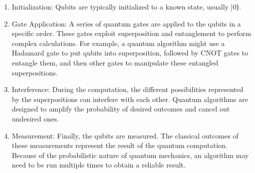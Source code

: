 \documentclass{article}
\begin{document}
 \begin{enumerate}
     \item Initialization: Qubits are typically initialized to a known state, usually |0⟩.

     \item Gate Application: A series of quantum gates are applied to the qubits in a specific order. These gates exploit superposition and entanglement to perform complex calculations. For example, a quantum algorithm might use a Hadamard gate to put qubits into superposition, followed by CNOT gates to entangle them, and then other gates to manipulate these entangled superpositions.

     \item Interference: During the computation, the different possibilities represented by the superpositions can interfere with each other. Quantum algorithms are designed to amplify the probability of desired outcomes and cancel out undesired ones.

     \item Measurement: Finally, the qubits are measured. The classical outcomes of these measurements represent the result of the quantum computation. Because of the probabilistic nature of quantum mechanics, an algorithm may need to be run multiple times to obtain a reliable result.
\end{enumerate}
\newpage
\newpage
\end{document}
